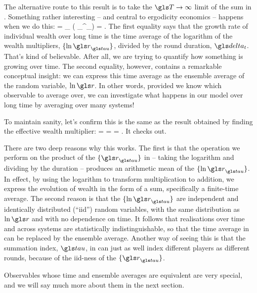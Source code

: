 The alternative route to this result is to take the $\T\to\infty$ limit of the sum in . Something rather interesting -- and central to ergodicity economics -- happens when we do this:
\be
\ggtime = \lim_{\T\to\infty}  \left( \sum_{}^\T \ln\gr_\gtau\right) =  \frac{\ave{\ln\gr}}{\dt}.
\ee
The first equality says that the growth rate of individual wealth over long time is the time average of the logarithm of the wealth multipliers, $\{\ln\gr_\gtau\}$, divided by the round duration, $\dt$. That's kind of believable. After all, we are trying to quantify how something is growing over time. The second equality, however, contains a remarkable conceptual insight: we can express this time average as the ensemble average of the random variable, $\ln\gr$. In other words, provided we know which observable to average over, we can investigate what happens in our model over long time by averaging over many systems!

To maintain sanity, let's confirm this is the same as the result obtained by finding the effective wealth multiplier:
\be
\frac{\ave{\ln\gr}}{\dt} =  =  = \frac{\ln\grtime}{\dt}.
\ee
It checks out.

There are two deep reasons why this works. The first is that the operation we perform on the product of the $\{\gr_\gtau\}$ in  -- taking the logarithm and dividing by the duration -- produces an arithmetic mean of the $\{\ln\gr_\gtau\}$. In effect, by using the logarithm to transform multiplication to addition, we express the evolution of wealth in the form of a sum, specifically a finite-time average. The second reason is that the $\{\ln\gr_\gtau\}$ are independent and identically distributed (``iid'') random variables, with the same distribution as $\ln\gr$ and with no dependence on time. It follows that realisations over time and across systems are statistically indistinguishable, so that the time average in  can be replaced by the ensemble average. Another way of seeing this is that the summation index, $\gtau$, in  can just as well index different players as different rounds, because of the iid-ness of the $\{\gr_\gtau\}$.

Observables whose time and ensemble averages are equivalent are very special, and we will say much more about them in the next section.

